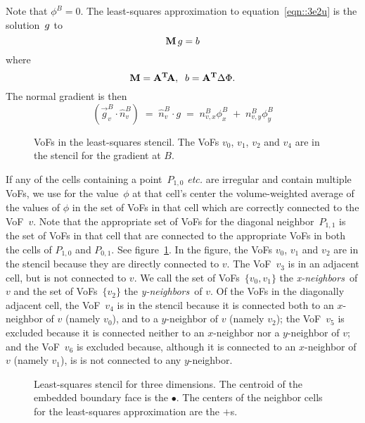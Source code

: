  Note that $\phi^B=0$.  The least-squares approximation to
 equation~\ref{eqn::3e2u} is the solution~$\boldmath g$ to
 \begin{equation}
 {\rm\bf M} \, {\boldmath g} = {\boldmath b}
 \end{equation}
 where
 \begin{equation}
 {\rm\bf M} = {\rm\bf A^T} \! {\rm\bf A},\;\; 
 {\boldmath b} = {\rm\bf A^T} {\boldmath \Delta \Phi}
 .
 \end{equation}
 The normal gradient is then
 \begin{equation}
 \left( \vec{g}^B_v \!\cdot\! \widehat{n}^B_v \right) \;=\;
 \widehat{n}^B_v \!\cdot\! g \;=\;
 n^B_{v,x} \phi^B_x \;+\; n^B_{v,y} \phi^B_y
 \end{equation}
 
 \begin{figure}
 \epsfxsize=3.0in
 \hspace{1.0in} 
 \caption{VoFs in the least-squares stencil.  The VoFs $v_0$, $v_1$,
 $v_2$ and $v_4$ are in the stencil for the gradient at $B$.}
 \label{fig::ls-vofs}
 \end{figure}
 
 If any of the cells containing a point~$P_{1,0}$ {\em etc.} are
 irregular and contain multiple VoFs, we use for the value~$\phi$ at
 that cell's center the volume-weighted average of the values of $\phi$
 in the set of VoFs in that cell which are correctly connected to the
 VoF~$v$.  Note that the appropriate set of VoFs for the diagonal
 neighbor~$P_{1,1}$ is the set of VoFs in that cell that are connected
 to the appropriate VoFs in both the cells of $P_{1,0}$ and $P_{0,1}$.
 See figure~\ref{fig::ls-vofs}.  In the figure, the VoFs $v_0$, $v_1$
 and $v_2$ are in the stencil because they are directly connected
 to $v$.  The VoF~$v_3$ is in an adjacent cell, but is not connected
 to $v$.  We call the set of VoFs~$\{v_0,v_1\}$ the {\em x-neighbors}\
 of $v$ and the set of VoFs~$\{v_2\}$ the {\em y-neighbors}\ of $v$.
 Of the VoFs in the diagonally adjacent cell, the VoF~$v_4$ is in the
 stencil because it is connected both to an $x$-neighbor of $v$
 (namely $v_0$), and to a $y$-neighbor of $v$ (namely $v_2$); the
 VoF~$v_5$ is excluded because it is connected neither to
 an $x$-neighbor nor a $y$-neighbor of $v$; and the VoF~$v_6$ is
 excluded because, although it is connected to an $x$-neighbor of $v$
 (namely $v_1$), is is not connected to any $y$-neighbor.
 
 \begin{figure}
 \epsfxsize=3.0in
 \hspace{1.0in} 
 \caption{Least-squares stencil for three dimensions.  The centroid of
 the embedded boundary face is the $\bullet$.  The centers of the neighbor
 cells for the least-squares approximation are the $+$s.}
 \label{fig::3dls}
 \end{figure}
 
